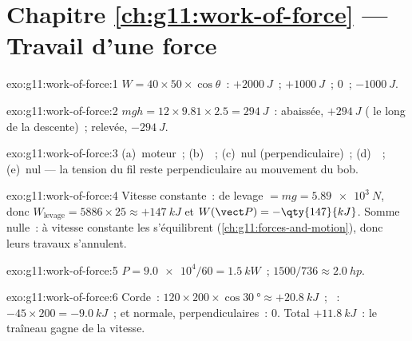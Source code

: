 \section*{Chapitre \ref{ch:g11:work-of-force} --- Travail d'une force}

\begin{solution}{exo:g11:work-of-force:1}
$W = 40 \times 50 \times \cos\theta$~: $+\qty{2000}{J}$~;
$+\qty{1000}{J}$~; $0$~; $-\qty{1000}{J}$.
\end{solution}

\begin{solution}{exo:g11:work-of-force:2}
$mgh = 12 \times 9.81 \times 2.5 = \qty{294}{J}$~: abaissée,
$+\qty{294}{J}$ ( le long de la
descente)~; relevée, $-\qty{294}{J}$.
\end{solution}

\begin{solution}{exo:g11:work-of-force:3}
(a)~moteur~; (b)~~;
(c)~nul (perpendiculaire)~; (d)~~;
(e)~nul --- la tension du fil reste
perpendiculaire au mouvement du bob.
\end{solution}

\begin{solution}{exo:g11:work-of-force:4}
Vitesse constante~:  de levage
$= mg = \qty{5.89e3}{N}$, donc
$W_{\text{levage}} = 5886 \times 25 \approx +\qty{147}{kJ}$ et
$W(\vect P) = -\qty{147}{kJ}$. Somme nulle~: à vitesse constante les
 s'équilibrent
(\cref{ch:g11:forces-and-motion}), donc leurs
travaux s'annulent.
\end{solution}

\begin{solution}{exo:g11:work-of-force:5}
$P = \num{9.0e4}/60 = \qty{1.5}{kW}$~; $1500/736 \approx \qty{2.0}{hp}$.
\end{solution}

\begin{solution}{exo:g11:work-of-force:6}
Corde~: $120 \times 200 \times \cos\qty{30}{\degree} \approx
+\qty{20.8}{kJ}$~; ~:
$-45 \times 200 = -\qty{9.0}{kJ}$~;
 et
 normale, perpendiculaires~: $0$.
Total $+\qty{11.8}{kJ}$~: le traîneau gagne de la vitesse.
\end{solution}


